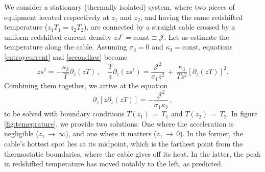 \documentclass[a4paper, amsfonts, amssymb, amsmath, reprint, showkeys, nofootinbib, twoside,notitlepage]{revtex4-1}
\theoremstyle{definition}
\theoremstyle{theorem}
\begin{document}
We consider a stationary (thermally isolated) system, where two pieces of equipment located respectively at $z_1$ and $z_2$, and having the same redshifted temperature ($z_1T_1=z_2T_2$), are connected by a straight cable crossed by a uniform redshifted current density $zJ^z {=}\text{const} {\equiv} \mathcal{J}$. Let us estimate the temperature along the cable. Assuming $\sigma_3{=}0$ and $\kappa_3{=}\text{const}$, equations \eqref{entroycurrent} and \eqref{secondlaw} become
\vspace{-0.1cm}
\begin{equation}\label{sz}
zs^z{=}-\dfrac{\kappa_3}{T} \partial_z (zT) \, ,\quad
\dfrac{T}{z}\partial_z(zs^z)=\dfrac{\mathcal{J}^2}{\sigma_1 z^2}\,{+}\,\dfrac{\kappa_3}{Tz^2} [\partial_z(zT)]^2 .
\end{equation}
Combining them together, we arrive at the equation
\vspace{-0.1cm}
\begin{equation}\label{dzdzT}
\partial_z\left[z\partial_z(zT)\right]=-\dfrac{\mathcal{J}^2}{\sigma_1\kappa_3} \, ,
\end{equation}
to be solved with boundary conditions $T(z_1)\,{=}\,T_1$ and $T(z_2)\,{=}\,T_2$. In figure \ref{fig:temeprature}, we provide two solutions: One where the acceleration is negligible ($z_1\, {\rightarrow}\, \infty$), and one where it matters ($z_1\,{\rightarrow}\, 0$). In the former, the cable’s hottest spot lies at its midpoint, which is the farthest point from the thermostatic boundaries, where the cable gives off its heat. In the latter, the peak in redshifted temperature has moved notably to the left, as predicted.
\end{document}
